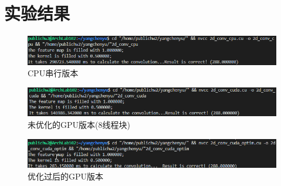 \documentclass{article}
\begin{document}
\section{实验结果}
\begin{figure}[h]
	\centering
	\includegraphics[width=1\linewidth]{result_cpu}
	\caption{CPU串行版本}
	\label{fig:cpu}
\end{figure}
\begin{figure}[h]
	\centering
	\includegraphics[width=1\linewidth]{result_cuda}
	\caption{未优化的GPU版本(8线程块)}
	\label{fig:gpu}
\end{figure}
\begin{figure}[h]
	\centering
	\includegraphics[width=1\linewidth]{result_cuda_optim}
	\caption{优化过后的GPU版本}
	\label{fig:gpu}
\end{figure}

	
\end{document}
